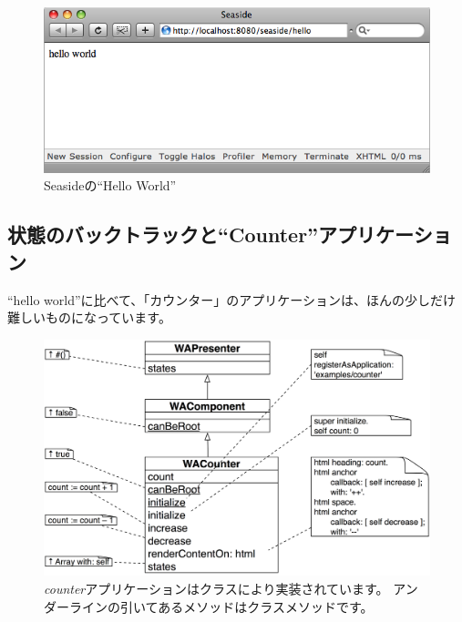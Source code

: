 \documentclass[a4paper,10pt,twoside]{book}
\begin{document}
\begin{figure}[htb]
\begin{center}
\includegraphics[width=\textwidth]{WAHelloWorld}
\caption{Seasideの``Hello World''}
\end{center}
\end{figure}

\subsection{状態のバックトラックと``Counter''アプリケーション}

``hello world''に比べて、「カウンター」のアプリケーションは、ほんの少しだけ難しいものになっています。

\begin{figure}[ht]
\begin{center}
\includegraphics[width=\textwidth]{WACounter}
\caption{\emph{counter}アプリケーションはクラスにより実装されています。  アンダーラインの引いてあるメソッドはクラスメソッドです。}
\end{center}
\end{figure}
\end{document}
